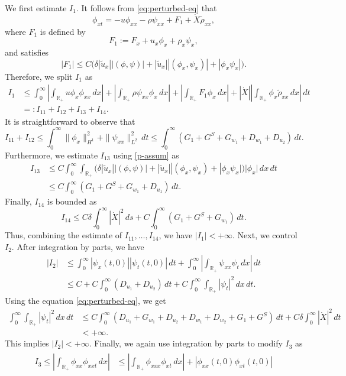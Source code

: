 \documentclass[11pt,reqno]{amsart}
\numberwithin{equation}{section} %
\newcommand{\R}{\mathbb{R}}
\begin{document}
\begin{appendix}
We first estimate $I_1$. It follows from \eqref{eq:perturbed-eq} that
\[\phi_{xt} = -u\phi_{xx}-\rho\psi_{xx}+F_1+\dot{X}\tilde{\rho}_{xx},\]
where $F_1$ is defined by
\[
F_1 := F_x + u_x \phi_x + \rho_x \psi_x,
\]
and satisfies
\[|F_1|\le C\big(\delta |\tilde{u}_x||(\phi,\psi)|+|\tilde{u}_x||(\phi_x,\psi_x)|+|\phi_x\psi_x|\big).\]
Therefore, we split $I_1$ as
\begin{align*}
	I_1&\le\int_0^\infty \left|\int_{\R_+}u\phi_x\phi_{xx}\,dx\right|+\left|\int_{\R_+}\rho\psi_{xx}\phi_x\,dx\right|+\left|\int_{\R_+}F_1\phi_x\,dx\right|+|\dot{X}|\left|\int_{\R_+}\phi_x\tilde{\rho}_{xx}\,dx\right|\,dt\\
	&=:I_{11}+I_{12}+I_{13}+I_{14}.
\end{align*}
It is straightforward to observe that
\[I_{11}+I_{12}\le \int_0^\infty \|\phi_x\|_{H^1}^2+\|\psi_{xx}\|_{L^2}^2\,dt\le\int_0^\infty (G_1+G^S+G_{w_1}+D_{w_1}+D_{u_2})\,dt.\]
Furthermore, we estimate $I_{13}$ using \eqref{p-assum} as
\begin{align*}
	I_{13}&\le C\int_0^\infty \int_{\R_+}(\delta|\tilde{u}_x||(\phi,\psi)|+|\tilde{u}_x||(\phi_x,\psi_x)+|\phi_x\psi_x|)|\phi_x|\,dx\,dt\\
	&\le C\int_0^\infty (G_1+G^S+G_{w_1}+D_{u_1})\,dt.
\end{align*}
Finally, $I_{14}$ is bounded as
\[I_{14}\le C\delta\int_0^\infty |\dot{X}|^2\,ds +C\int_0^\infty (G_1+G^S+G_{w_1})\,dt.\]
Thus, combining the estimate of $I_{11},\ldots,I_{14}$, we have $|I_1|<+\infty$. Next, we control $I_2$. After integration by parts, we have
\begin{align*}
	|I_2|&\le \int_0^\infty |\psi_x(t,0)||\psi_t(t,0)|\,dt+\int_0^\infty\left|\int_{\R_+}\psi_{xx}\psi_{t}\,dx\right|\,dt\\
	&\le C+C\int_0^\infty (D_{u_1}+D_{u_2})\,dt+C\int_0^\infty\int_{\R_+}|\psi_t|^2\,dx\,dt.
\end{align*}
Using the equation \eqref{eq:perturbed-eq}, we get
\begin{align*}
	\int_0^\infty \int_{\R_+}|\psi_t|^2\,dx\,dt&\le C\int_0^\infty (D_{u_1}+G_{w_1}+D_{u_2}+D_{w_1}+D_{w_2}+G_1+G^S)\,dt+C\delta\int_0^\infty |\dot{X}|^2\,dt\\
	&< +\infty.
\end{align*}
This implies $|I_{2}|<+\infty$. Finally, we again use integration by parts to modify $I_3$ as
\begin{align}
\begin{aligned}\label{I3}	
	I_3\le\left|\int_{\R_+}\phi_{xx}\phi_{xxt}\,dx\right| &\le \left|\int_{\R_+}\phi_{xxx}\phi_{xt}\,dx\right|+|\phi_{xx}(t,0)\phi_{xt}(t,0)|\\

\end{aligned}
\end{align}
\end{appendix}
\end{document}
